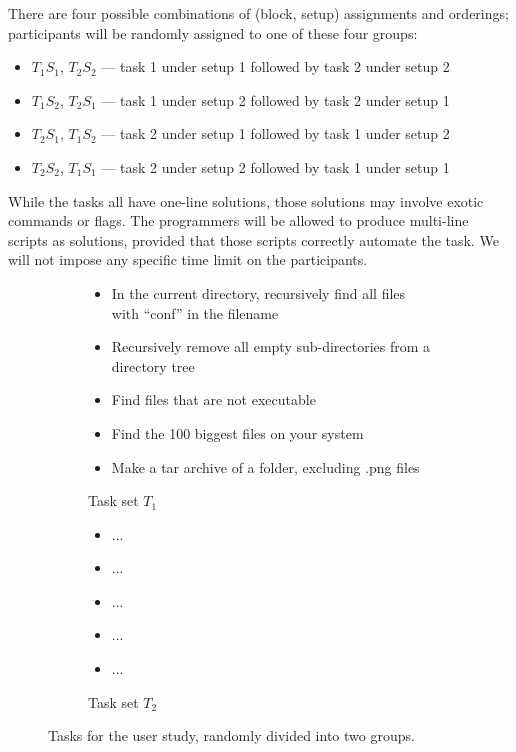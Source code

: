 There are four possible combinations of (block, setup) assignments and
orderings; participants will be randomly assigned to one of these four groups:
\begin{itemize}
    \item $T_1 S_1$, $T_2 S_2$ --- task 1 under setup 1 followed by task 2 under setup 2
    \item $T_1 S_2$, $T_2 S_1$ --- task 1 under setup 2 followed by task 2 under setup 1
    \item $T_2 S_1$, $T_1 S_2$ --- task 2 under setup 1 followed by task 1 under setup 2
    \item $T_2 S_2$, $T_1 S_1$ --- task 2 under setup 2 followed by task 1 under setup 1
\end{itemize}

While the tasks all have one-line solutions, those solutions may involve exotic
commands or flags. The programmers will be allowed to produce multi-line scripts
as solutions, provided that those scripts correctly automate the task. We will
not impose any specific time limit on the participants.

\begin{figure}[ht]
    \begin{subfigure}[b]{0.48\textwidth}
        \begin{framed}
        \begin{itemize}\itemsep-1pt
            \item In the current directory, recursively find all files with ``conf''
                in the filename
            \item Recursively remove all empty sub-directories from a directory tree
            \item Find files that are not executable
            \item Find the 100 biggest files on your system
            \item Make a tar archive of a folder, excluding .png files
        \end{itemize}
        \end{framed}
        \caption{Task set $T_1$}
    \end{subfigure}
    \begin{subfigure}[b]{0.48\textwidth}
        \begin{framed}
        \begin{itemize}\itemsep-1pt
            \item ...
            \item ...
            \item ...
            \item ...
            \item ...
        \end{itemize}
        \end{framed}
        \caption{Task set $T_2$}
    \end{subfigure}
    \caption{Tasks for the user study, randomly divided into two groups.}
    \vspace{-10pt}
    \label{fig:tasks}
\end{figure}

